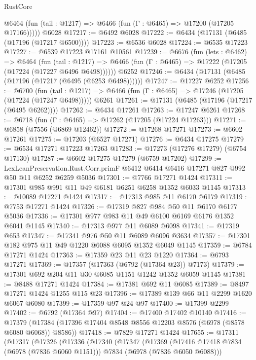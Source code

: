 \begin{lexlean}{RustCore}
\begin{coremodule}
      @6464 (fun (tail : @1217) => @6466 (fun (Γ : @6465) => @17200 (@17205 @17166)))))
    @6028
@17217 := @6492 @6028
@17222 := @6434 (@17131 (@6485 (@17196 (@17217 @6500))))
@17223 := @6536 @6028
@17224 := @6535 @17223
@17227 := @6539 @17223 @17161 @10561
@17239 := @6676
    (fun (lets : @6462) =>
    @6464
      (fun (tail : @1217) =>
      @6466 (fun (Γ : @6465) => @17222 (@17205 (@17224 (@17227 @6496 @6498))))))
    @6252
@17246 := @6434 (@17131 (@6485 (@17196 (@17217 (@6495 (@6253 @6498))))))
@17247 := @17227 @6252
@17256 := @6700
    (fun (tail : @1217) => @6466 (fun (Γ : @6465) => @17246 (@17205 (@17224 (@17247 @6498)))))
    @6261
@17261 := @17131 (@6485 (@17196 (@17217 (@6495 @6262))))
@17262 := @6434 @17261
@17263 := @17247 @6261
@17268 := @6718 (fun (Γ : @6465) => @17262 (@17205 (@17224 @17263)))
@17271 := @6858 (@7556 (@6869 @12462))
@17272 := @17268 @17271
@17273 := @6602 @17261
@17275 := @17203 (@6527 @17271)
@17276 := @6434 @17275
@17279 := @6534 @17271 @17223 @17263
@17283 := @17273 (@17276 @17279) (@6754 @17130)
@17287 := @6602 @17275 @17279 (@6759 @17202)
@17299 := LexLeanPreservation.Rust.Corr.primF
    @6412
    @6414
    @6416
    @17271
    @827
    @992
    @50
    @11
    @6252
    @6259
    @5036
@17301 := @7766 @17271 @1424
@17311 := @17301 @985 @991 @11 @49 @6181 @6251 @6258 @1352 @6033 @1145
@17313 := @10089 @17271 @1424
@17317 := @17313 @985 @11 @6170 @6179
@17319 := @7753 @17271 @1424
@17326 := @17319 @827 @984 @50 @11 @6170 @6177 @5036
@17336 := @17301 @977 @983 @11 @49 @6100 @6169 @6176 @1352 @6041 @1145
@17340 := @17313 @977 @11 @6089 @6098
@17341 := @17319 @653
@17347 := @17341 @976 @50 @11 @6089 @6096 @3634
@17357 := @17301 @182 @975 @11 @49 @1220 @6088 @6095 @1352 @6049 @1145
@17359 := @6784 @17271 @1424
@17363 := @17359 @23 @11 @23 @1220
@17364 := @6793 @17271
@17369 := @17357 (@17363 (@6792 (@17364 @23)) @7173)
@17379 := @17301 @692 @204 @11 @30 @6085 @1151 @1242 @1352 @6059 @1145
@17381 := @8488 @17271 @1424
@17384 := @17381 @692 @11 @6085
@17389 := @8497 @17271 @1424 @1255 @115 @23
@17396 := @17389 @139 @66 @11 @2299 @1620 @6067 @6080
@17399 := @17359 @97 @24 @97
@17400 := @17399 @2299
@17402 := @6792 (@17364 @97)
@17404 := @17400 @17402 @10140
@17416 := @17379 (@17384 (@17396 @17404 @8548 @8556 @12203 @8576 (@6978 (@8578 @6080 @6068)) @8586))
@17418 := @7829 @17271 @1424
@17655 := @17311
    (@17317
      (@17326
        (@17336
          (@17340
            (@17347
              (@17369
                (@17416 @17418 @7834 (@6978 (@7836 @6060 @1151)))
                @7834
                (@6978 (@7836 @6050 @6088)))

\end{coremodule}
\end{lexlean}
